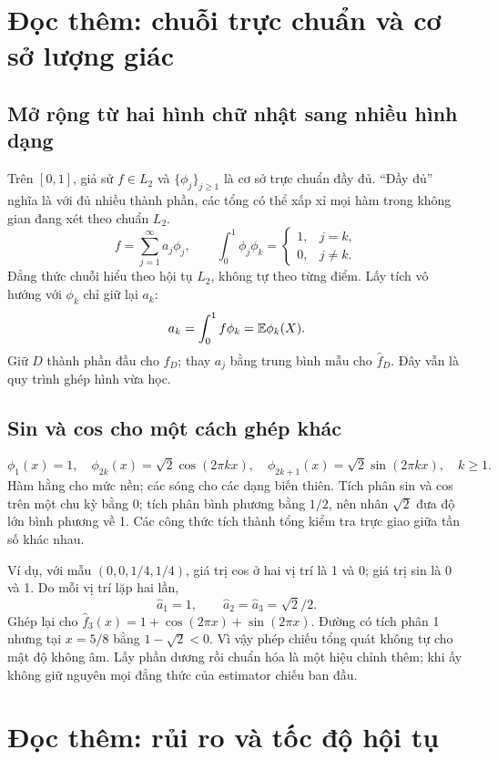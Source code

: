 \section{Đọc thêm: chuỗi trực chuẩn và cơ sở lượng giác}
\subsection{Mở rộng từ hai hình chữ nhật sang nhiều hình dạng}
Trên $[0,1]$, giả sử $f\in L_2$ và $\{\phi_j\}_{j\geq1}$ là cơ sở
trực chuẩn đầy đủ. ``Đầy đủ'' nghĩa là với đủ nhiều thành phần, các tổng
có thể xấp xỉ mọi hàm trong không gian đang xét theo chuẩn $L_2$.
\[
f=\sum_{j=1}^{\infty}a_j\phi_j,\qquad
\int_0^1\phi_j\phi_k=\begin{cases}1,&j=k,\\0,&j\ne k.
\end{cases}
\]
Đẳng thức chuỗi hiểu theo hội tụ $L_2$, không tự theo từng điểm.
Lấy tích vô hướng với $\phi_k$ chỉ giữ lại $a_k$:
\[
a_k=\int_0^1f\phi_k=\mathbb E\phi_k(X).
\]
Giữ $D$ thành phần đầu cho $f_D$; thay $a_j$ bằng trung bình mẫu cho
$\widehat f_D$. Đây vẫn là quy trình ghép hình vừa học.

\subsection{Sin và cos cho một cách ghép khác}
\[
\phi_1(x)=1,\quad \phi_{2k}(x)=\sqrt2\cos(2\pi kx),\quad
\phi_{2k+1}(x)=\sqrt2\sin(2\pi kx),\quad k\geq1.
\]
Hàm hằng cho mức nền; các sóng cho các dạng biến thiên. Tích phân sin và
cos trên một chu kỳ bằng 0; tích phân bình phương bằng $1/2$, nên nhân
$\sqrt2$ đưa độ lớn bình phương về 1.
Các công thức tích thành tổng kiểm tra trực giao giữa tần số khác nhau.

Ví dụ, với mẫu $(0,0,1/4,1/4)$, giá trị cos ở hai vị trí là 1 và 0;
giá trị sin là 0 và 1. Do mỗi vị trí lặp hai lần,
\[
\widehat a_1=1,\qquad\widehat a_2=\widehat a_3=\sqrt2/2.
\]
Ghép lại cho
$\widehat f_3(x)=1+\cos(2\pi x)+\sin(2\pi x)$.
Đường có tích phân 1 nhưng tại $x=5/8$ bằng $1-\sqrt2<0$.
Vì vậy phép chiếu tổng quát không tự cho mật độ không âm.
Lấy phần dương rồi chuẩn hóa là một hiệu chỉnh thêm; khi ấy không giữ
nguyên mọi đẳng thức của estimator chiếu ban đầu.

\section{Đọc thêm: rủi ro và tốc độ hội tụ}
